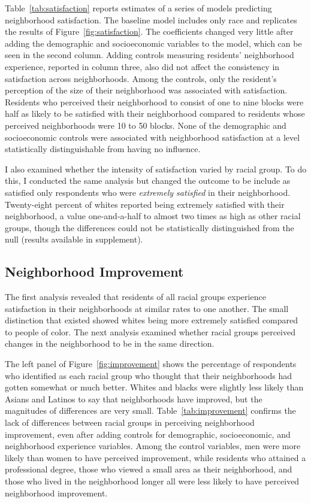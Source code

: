 \documentclass[11pt]{baderart}
\begin{document}

Table~\ref{tab:satisfaction} reports estimates of a series of models predicting neighborhood satisfaction. The baseline model includes only race and replicates the results of Figure~\ref{fig:satisfaction}. The coefficients changed very little after adding the demographic and socioeconomic variables to the model, which can be seen in the second column. Adding controls measuring residents' neighborhood experience, reported in column three, also did not affect the consistency in satisfaction across neighborhoods. Among the controls, only the resident's perception of the size of their neighborhood was associated with satisfaction. Residents who perceived their neighborhood to consist of one to nine blocks were half as likely to be satisfied with their neighborhood compared to residents whose perceived neighborhoods were 10 to 50 blocks. None of the demographic and socioeconomic controls were associated with neighborhood satisfaction at a level statistically distinguishable from having no influence. 


I also examined whether the intensity of satisfaction varied by racial group. To do this, I conducted the same analysis but changed the outcome to be include as satisfied only respondents who were \emph{extremely satisfied} in their neighborhood. Twenty-eight percent of whites reported being extremely satisfied with their neighborhood, a value one-and-a-half to almost two times as high as other racial groups, though the differences could not be statistically distinguished from the null (results available in supplement). 

\subsection{Neighborhood Improvement}
The first analysis revealed that residents of all racial groups experience satisfaction in their neighborhoods at similar rates to one another. The small distinction that existed showed whites being more extremely satisfied compared to people of color. The next analysis examined whether racial groups perceived changes in the neighborhood to be in the same direction. 

The left panel of Figure~\ref{fig:improvement} shows the percentage of respondents who identified as each racial group who thought that their neighborhoods had gotten somewhat or much better. Whites and blacks were slightly less likely than Asians and Latinos to say that neighborhoods have improved, but the magnitudes of differences are very small. Table~\ref{tab:improvement} confirms the lack of differences between racial groups in perceiving neighborhood improvement, even after adding controls for demographic, socioeconomic, and neighborhood experience variables. Among the control variables, men were more likely than women to have perceived improvement, while residents who attained a professional degree, those who viewed a small area as their neighborhood, and those who lived in the neighborhood longer all were less likely to have perceived neighborhood improvement. 
\end{document}

